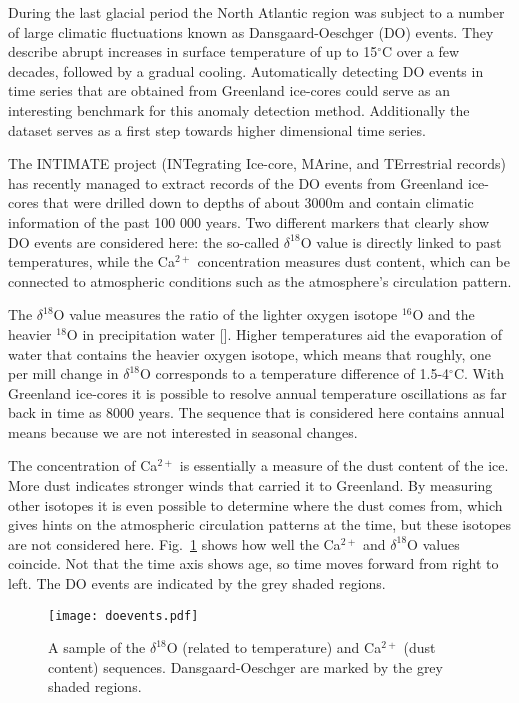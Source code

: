 During the last glacial period the North Atlantic region was subject to a
number of large climatic fluctuations known as Dansgaard-Oeschger (DO) events.
They describe abrupt increases in surface temperature of up to 15$^\circ$C over
a few decades, followed by a gradual cooling. Automatically detecting DO events
in time series that are obtained from Greenland ice-cores could serve as an
interesting benchmark for this anomaly detection method. Additionally the
dataset serves as a first step towards higher dimensional time series.

The INTIMATE project (INTegrating Ice-core, MArine, and TErrestrial records)
has recently managed to extract records of the DO events from Greenland
ice-cores that were drilled down to depths of about 3000m and contain climatic
information of the past 100 000 years.  Two different markers that clearly show
DO events are considered here: the so-called $\delta^{18}$O value is directly
linked to past temperatures, while the Ca$^{2+}$ concentration measures dust
content, which can be connected to atmospheric conditions such as the
atmosphere's circulation pattern.

The $\delta^{18}$O value measures the ratio of the lighter oxygen isotope
$^{16}$O and the heavier $^{18}$O in precipitation water [\cite{rasmussen2014}].
Higher temperatures aid the evaporation of water that contains the heavier
oxygen isotope, which means that roughly, one per mill change in $\delta^{18}$O
corresponds to a temperature difference of 1.5-4$^\circ$C.  With Greenland
ice-cores it is possible to resolve annual temperature oscillations as far back
in time as 8000 years. The sequence that is considered here contains annual
means because we are not interested in seasonal changes.

The concentration of Ca$^{2+}$ is essentially a measure of the dust content of
the ice. More dust indicates stronger winds that carried it to Greenland. By
measuring other isotopes it is even possible to determine where the dust comes
from, which gives hints on the atmospheric circulation patterns at the time,
but these isotopes are not considered here.  Fig.~\ref{fig:doevents} shows how
well the Ca$^{2+}$ and $\delta^{18}$O values coincide. Not that the time axis
shows age, so time moves forward from right to left. The DO events are
indicated by the grey shaded regions.

\begin{figure}
  \centering
  \texttt{[image: doevents.pdf]}
  \caption{A sample of the $\delta^{18}$O (related to temperature) and
  Ca$^{2+}$ (dust content) sequences.  Dansgaard-Oeschger are marked by the
  grey shaded regions.}
  \label{fig:doevents}
\end{figure}



